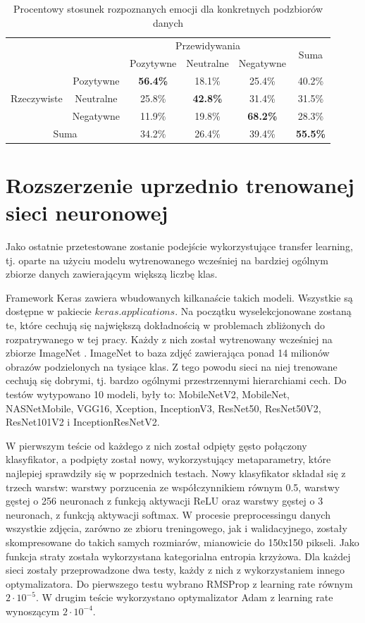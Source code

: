 \begin{table}[H]
  \centering
  \caption{Procentowy stosunek rozpoznanych emocji dla konkretnych podzbiorów danych}
    \begin{tabular}{ |cc|ccc|c| }
    \hline
    && \multicolumn{3}{c|}{Przewidywania} & \multirow{2}{*}{Suma} \\
    && Pozytywne & Neutralne & \multicolumn{1}{c|}{Negatywne} & \\
    \hline
    \multirow{3}{*}{Rzeczywiste} & Pozytywne & \textbf{56.4\%} & 18.1\% & 25.4\% & 40.2\% \\
    & Neutralne & 25.8\% & \textbf{42.8\%} & 31.4\% & 31.5\% \\
    & Negatywne & 11.9\% & 19.8\% & \textbf{68.2\%} & 28.3\% \\
    \hline
    \multicolumn{2}{|c|}{Suma} & 34.2\% & 26.4\% & 39.4\% & \textbf{55.5\%}\\
    \hline
    \end{tabular}
  \label{tab:5.11}
\end{table}


\section{Rozszerzenie uprzednio trenowanej sieci neuronowej}
Jako ostatnie przetestowane zostanie podejście wykorzystujące transfer learning, tj. oparte na użyciu modelu wytrenowanego wcześniej na bardziej ogólnym zbiorze danych zawierającym większą liczbę klas.

Framework Keras zawiera wbudowanych kilkanaście takich modeli. Wszystkie są dostępne w pakiecie $keras.applications$. Na początku wyselekcjonowane zostaną te, które cechują się największą dokładnością w problemach zbliżonych do rozpatrywanego w tej pracy. Każdy z nich został wytrenowany wcześniej na zbiorze ImageNet \cite{ImageNet}. ImageNet to baza zdjęć zawierająca ponad 14 milionów obrazów podzielonych na tysiące klas. Z tego powodu sieci na niej trenowane cechują się dobrymi, tj. bardzo ogólnymi przestrzennymi hierarchiami cech. Do testów wytypowano 10 modeli, były to: MobileNetV2, MobileNet, NASNetMobile, VGG16, Xception, InceptionV3, ResNet50, ResNet50V2, ResNet101V2 i InceptionResNetV2.

W pierwszym teście od każdego z nich został odpięty gęsto połączony klasyfikator, a podpięty został nowy, wykorzystujący metaparametry, które najlepiej sprawdziły się w poprzednich testach. Nowy klasyfikator składał się z trzech warstw: warstwy porzucenia ze współczynnikiem równym 0.5, warstwy gęstej o 256 neuronach z funkcją aktywacji ReLU oraz warstwy gęstej o 3 neuronach, z funkcją aktywacji softmax. W procesie preprocessingu danych wszystkie zdjęcia, zarówno ze zbioru treningowego, jak i walidacyjnego, zostały skompresowane do takich samych rozmiarów, mianowicie do 150x150 pikseli. Jako funkcja straty została wykorzystana kategorialna entropia krzyżowa. Dla każdej sieci zostały przeprowadzone dwa testy, każdy z nich z wykorzystaniem innego optymalizatora. Do pierwszego testu wybrano RMSProp z learning rate równym $2\cdot10^{-5}$. W drugim teście wykorzystano optymalizator Adam z learning rate wynoszącym $2\cdot10^{-4}$.

